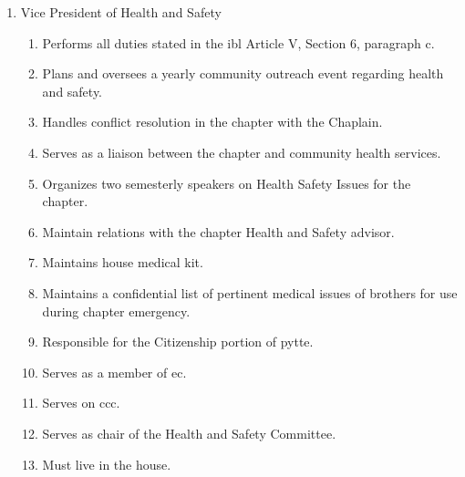 \begin{enumerate}
		\item Vice President of Health and Safety
			\begin{enumerate}
				\item Performs all duties stated in the \gls{ibl} Article V, Section 6, paragraph c.
				\item Plans and oversees a yearly community outreach event regarding health and safety.
				\item Handles conflict resolution in the chapter with the Chaplain.
				\item Serves as a liaison between the chapter and community health services.
				\item Organizes two semesterly speakers on Health Safety Issues for the chapter.
				\item Maintain relations with the chapter Health and Safety advisor.
				\item Maintains house medical kit.
				\item Maintains a confidential list of pertinent medical issues of brothers for use during chapter emergency.
				\item Responsible for the Citizenship portion of \gls{pytte}.
				\item Serves as a member of \gls{ec}.
				\item Serves on \gls{ccc}.
				\item Serves as chair of the Health and Safety Committee.
				\item Must live in the house.
			\end{enumerate}


\end{enumerate}
